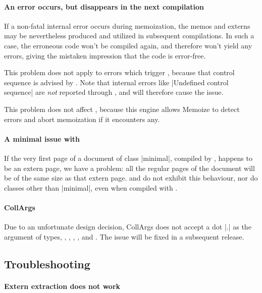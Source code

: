 \documentclass[a4paper,11pt]{article}
\begin{document}
\paragraph{An error occurs, but disappears in the next compilation}
If a non-fatal internal  error occurs during memoization, the memos
and externs may be nevertheless produced and utilized in subsequent
compilations.  In such a case, the erroneous code won't be compiled again, and
therefore won't yield any errors, giving the mistaken impression that the code
is error-free.

This problem does not apply to errors which trigger ,
because that control sequence is advised by .
Note that internal  errors like |Undefined control sequence| are
\emph{not} reported through , and will therefore cause the
issue.

This problem does not affect , because this engine allows
Memoize to detect errors and abort memoization if it encounters any.


\paragraph{A minimal issue with }
If the very first page of a document of class |minimal|, compiled by
, happens to be an extern page, we have a problem: all the
regular pages of the document will be of the same size as that extern page.
 and  do not exhibit this behaviour, nor do
 classes other than |minimal|, even when compiled with
.


\paragraph{CollArgs}

Due to an unfortunate design decision, CollArgs does not accept a dot |.| as
the  argument of types, , ,
, , and .  The issue will be
fixed in a subsequent release.


\subsection{Troubleshooting}
\label{sec:troubleshooting}

\paragraph{Extern extraction does not work}
\label{sec:fadings-problem}
\label{sec:loading-order}
\end{document}
